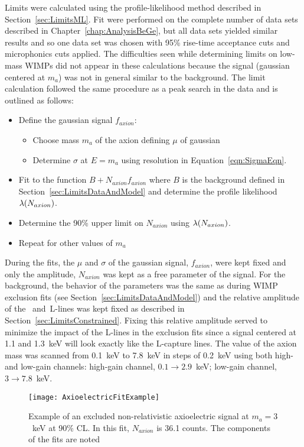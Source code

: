 	Limits were calculated using the profile-likelihood method described in Section~\ref{sec:LimitsML}.  Fit were performed on the complete number of data sets described in Chapter~\ref{chap:AnalysisBeGe}, but all data sets yielded similar results and so one data set was chosen with 95\% rise-time acceptance cuts and microphonics cuts applied.  The difficulties seen while determining limits on low-mass WIMPs did not appear in these calculations because the signal (gaussian centered at $m_{a}$) was not in general similar to the background.  The limit calculation followed the same procedure as a peak search in the data and is outlined as follows:
		\begin{itemize}
			\item Define the gaussian signal $f_{axion}$: 
			\begin{itemize}
				\item Choose mass $m_{a}$ of the axion defining $\mu$ of gaussian
				\item Determine $\sigma$ at $E = m_{a}$ using resolution in Equation~\ref{eqn:SigmaEqn}.
			\end{itemize}
			\item Fit to the function $B + N_{axion} f_{axion}$ where $B$ is the background defined in Section~\ref{sec:LimitsDataAndModel} and determine the profile likelihood $\lambda(N_{axion})$.
			\item Determine the 90\% upper limit on $N_{axion}$ using $\lambda(N_{axion})$.
			\item Repeat for other values of $m_{a}$
		\end{itemize}		
	
	During the fits, the $\mu$ and $\sigma$ of the gaussian signal, $f_{axion}$, were kept fixed and only the amplitude, $N_{axion}$ was kept as a free parameter of the signal.  For the background, the behavior of the parameters was the same as during WIMP exclusion fits (see Section~\ref{sec:LimitsDataAndModel}) and the relative amplitude of the \gersixeight~and\znsixfive~L-lines was kept fixed as described in Section~\ref{sec:LimitsConstrained}.  Fixing this relative amplitude served to minimize the impact of the L-lines in the exclusion fits since a signal centered at 1.1 and 1.3~keV will look exactly like the L-capture lines.  The value of the axion mass was scanned from 0.1~keV to 7.8~keV in steps of 0.2~keV using both high- and low-gain channels: high-gain channel, $0.1\to2.9$~keV; low-gain channel, $3\to7.8$~keV.  

		\begin{figure}
			\centering
			\texttt{[image: AxioelectricFitExample]}
			\caption[Example of an excluded non-relativistic axioelectric signal at $m_{a}=3$~keV at 
			90\% CL]{Example of an excluded non-relativistic axioelectric signal at $m_{a}=3$~keV at 
			90\% CL.  In this fit, $N_{axion}$ is 36.1 counts.  The components of the fits are noted}
			\label{fig:ExampleHeavyAxionFit}
		\end{figure}
			
